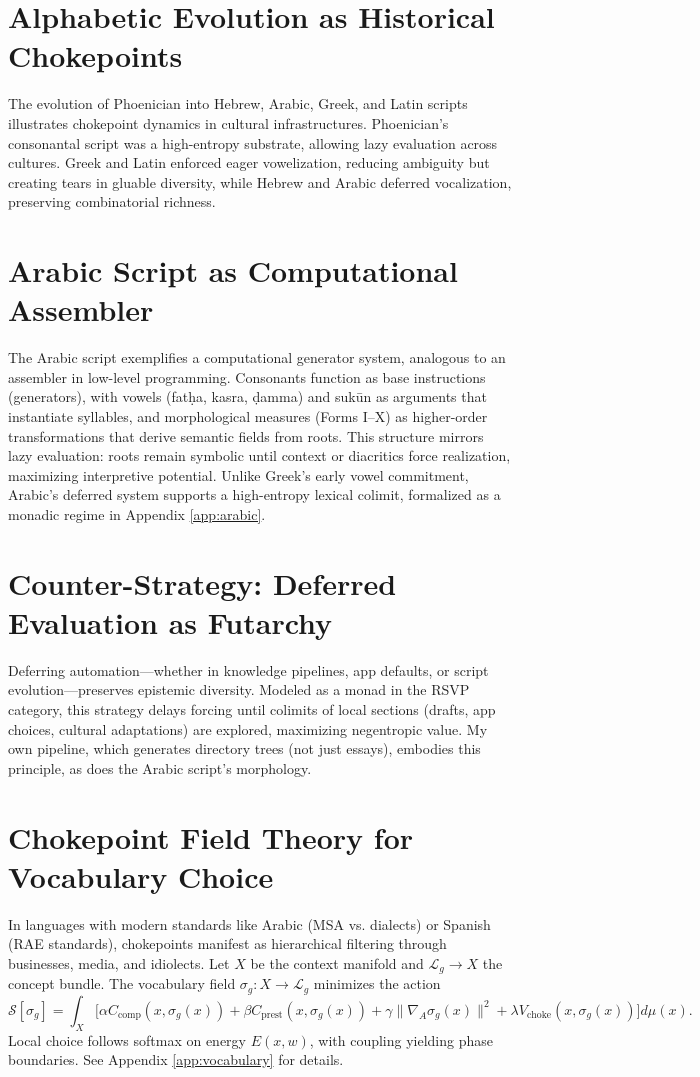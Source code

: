 \documentclass[12pt]{article}
\begin{document}
\section{Alphabetic Evolution as Historical Chokepoints}
The evolution of Phoenician into Hebrew, Arabic, Greek, and Latin scripts illustrates chokepoint dynamics in cultural infrastructures. Phoenician’s consonantal script was a high-entropy substrate, allowing lazy evaluation across cultures. Greek and Latin enforced eager vowelization, reducing ambiguity but creating tears in gluable diversity, while Hebrew and Arabic deferred vocalization, preserving combinatorial richness.

\section{Arabic Script as Computational Assembler}
\label{sec:arabicassembler}
The Arabic script exemplifies a computational generator system, analogous to an assembler in low-level programming. Consonants function as base instructions (generators), with vowels (fatḥa, kasra, ḍamma) and sukūn as arguments that instantiate syllables, and morphological measures (Forms I–X) as higher-order transformations that derive semantic fields from roots. This structure mirrors lazy evaluation: roots remain symbolic until context or diacritics force realization, maximizing interpretive potential. Unlike Greek’s early vowel commitment, Arabic’s deferred system supports a high-entropy lexical colimit, formalized as a monadic regime in Appendix \ref{app:arabic}.

\section{Counter-Strategy: Deferred Evaluation as Futarchy}
Deferring automation—whether in knowledge pipelines, app defaults, or script evolution—preserves epistemic diversity. Modeled as a monad in the RSVP category, this strategy delays forcing until colimits of local sections (drafts, app choices, cultural adaptations) are explored, maximizing negentropic value. My own pipeline, which generates directory trees (not just essays), embodies this principle, as does the Arabic script’s morphology.

\section{Chokepoint Field Theory for Vocabulary Choice}
In languages with modern standards like Arabic (MSA vs. dialects) or Spanish (RAE standards), chokepoints manifest as hierarchical filtering through businesses, media, and idiolects. Let $X$ be the context manifold and $\mathcal{L}_g \to X$ the concept bundle. The vocabulary field $\sigma_g: X \to \mathcal{L}_g$ minimizes the action
\[
\mathcal{S}[\sigma_g] = \int_X \big[ \alpha C_{\text{comp}}(x,\sigma_g(x)) + \beta C_{\text{prest}}(x,\sigma_g(x)) + \gamma \|\nabla_A \sigma_g(x)\|^2 + \lambda V_{\text{choke}}(x,\sigma_g(x)) \big] d\mu(x).
\]
Local choice follows softmax on energy $E(x,w)$, with coupling yielding phase boundaries. See Appendix \ref{app:vocabulary} for details.
\end{document}
